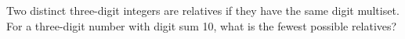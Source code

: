 Two distinct three-digit integers are relatives if they have the same digit multiset. For a three-digit number with digit sum 10, what is the fewest possible relatives?
